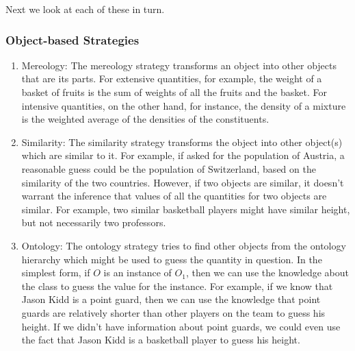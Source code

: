Next we look at each of these in turn.


\subsubsection{Object-based Strategies}
%
\begin{enumerate}
\item Mereology: The mereology strategy transforms an object into other objects that are its parts. For extensive quantities, for example, the weight of a basket of fruits is the sum of weights of all the fruits and the basket. For intensive quantities, on the other hand, for instance, the density of a mixture is the weighted average of the densities of the constituents.
%
\item Similarity: The similarity strategy transforms the object into other object(s) which are similar to it. For example, if asked for the population of Austria, a reasonable guess could be the population of Switzerland, based on the similarity of the two countries. However, if two objects are similar, it doesn't warrant the inference that values of all the quantities for two objects are similar. For example, two similar basketball players might have similar height, but not necessarily two professors.
%
\item Ontology: The ontology strategy tries to find other objects from the ontology hierarchy which might be used to guess the quantity in question. In the simplest form, if $O$ is an instance of $O_1$, then we can use the knowledge about the class to guess the value for the instance. For example, if we know that Jason Kidd is a point guard, then we can use the knowledge that point guards are relatively shorter than other players on the team to guess his height. If we didn't have information about point guards, we could even use the fact that Jason Kidd is a basketball player to guess his height.
\end{enumerate}


